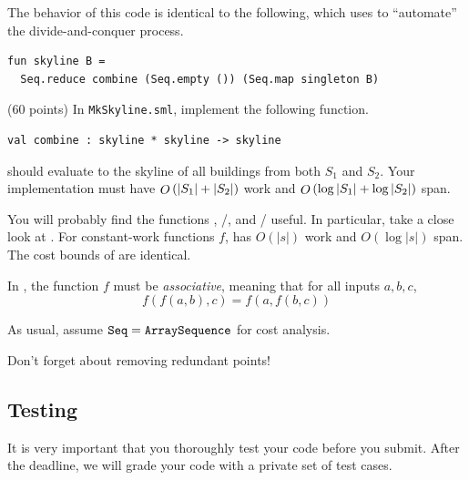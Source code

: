 \begin{remark}
The behavior of this code is identical to the following, which uses
 to ``automate'' the divide-and-conquer process.
\begin{verbatim}
fun skyline B =
  Seq.reduce combine (Seq.empty ()) (Seq.map singleton B)
\end{verbatim}
\end{remark}
\begin{task}[1]
\label{task:skylinelab:1}
(60 points)
In \texttt{MkSkyline.sml}, implement the following function.
\begin{verbatim}
val combine : skyline * skyline -> skyline
\end{verbatim}
 should evaluate to the skyline of all buildings
from both $S_1$ and $S_2$. Your implementation must have $\mathop{O}\left(|S_1| + |S_2|\right)$ work
and $\mathop{O}\left(\log|S_1| + \log|S_2|\right)$ span.
\end{task}
\begin{hint}
You will probably find the functions ,
/, and /
useful. In particular, take a close look at .
For constant-work functions $f$,  has $O(|s|)$ work and
$O(\log|s|)$ span. The cost bounds of  are identical.
\end{hint}
\begin{important}
In , the function $f$ must be \emph{associative}, meaning that
for all inputs $a,b,c$,
\[ f(f(a,b),c) = f(a,f(b,c)) \]
\end{important}
\begin{note}
As usual, assume $\texttt{Seq} = \texttt{ArraySequence}$ for cost analysis.
\end{note}
\begin{note}
Don't forget about removing redundant points!
\end{note}

\subsection{Testing}
\begin{gram}
It is very important that you thoroughly test your code before you
submit. After the deadline, we will grade your code with a private set of test
cases.
\end{gram}

